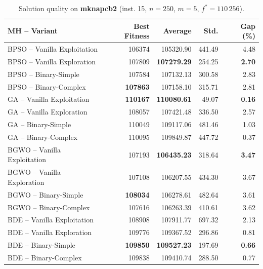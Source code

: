 \begin{table}[htbp]
  \centering
  \small
  \caption{Solution quality on \textbf{mknapcb2} (inst. 15, $n=250$, $m=5$, $f^*=110\,256$).}
  \label{tab:calidad_mknapcb2_15}
  \begin{tabular}{lrrrr}
    \toprule
    \textbf{MH -- Variant} &
    \textbf{Best Fitness} &
    \textbf{Average} &
    \textbf{Std.} &
    \textbf{Gap (\%)} \\
    \midrule
    BPSO -- Vanilla Exploitation &         106374 &        105320.90 & 441.49 &         4.48 \\
    BPSO -- Vanilla Exploration  &         107809 & \textbf{107279.29} & 254.25 & \textbf{2.70} \\
    BPSO -- Binary-Simple        &         107584 &        107132.13 & 300.58 &         2.83 \\
    BPSO -- Binary-Complex       & \textbf{107863} &        107158.10 & 315.71 &         2.81 \\
    \midrule
    GA -- Vanilla Exploitation   & \textbf{110167} & \textbf{110080.61} &  49.07 & \textbf{0.16} \\
    GA -- Vanilla Exploration    &         108057 &        107421.48 & 336.50 &         2.57 \\
    GA -- Binary-Simple          &         110049 &        109117.06 & 481.46 &         1.03 \\
    GA -- Binary-Complex         &         110095 &        109849.87 & 447.72 &         0.37 \\
    \midrule
    BGWO -- Vanilla Exploitation &         107193 & \textbf{106435.23} & 318.64 & \textbf{3.47} \\
    BGWO -- Vanilla Exploration  &         107108 &        106207.55 & 434.30 &         3.67 \\
    BGWO -- Binary-Simple        & \textbf{108034} &        106278.61 & 482.64 &         3.61 \\
    BGWO -- Binary-Complex       &         107616 &        106263.39 & 410.61 &         3.62 \\
    \midrule
    BDE -- Vanilla Exploitation  &         108908 &        107911.77 & 697.32 &         2.13 \\
    BDE -- Vanilla Exploration   &         109776 &        109367.52 & 296.86 &         0.81 \\
    BDE -- Binary-Simple         & \textbf{109850} & \textbf{109527.23} & 197.69 & \textbf{0.66} \\
    BDE -- Binary-Complex        &         109838 &        109410.74 & 288.50 &         0.77 \\
    \bottomrule
  \end{tabular}
\end{table}
